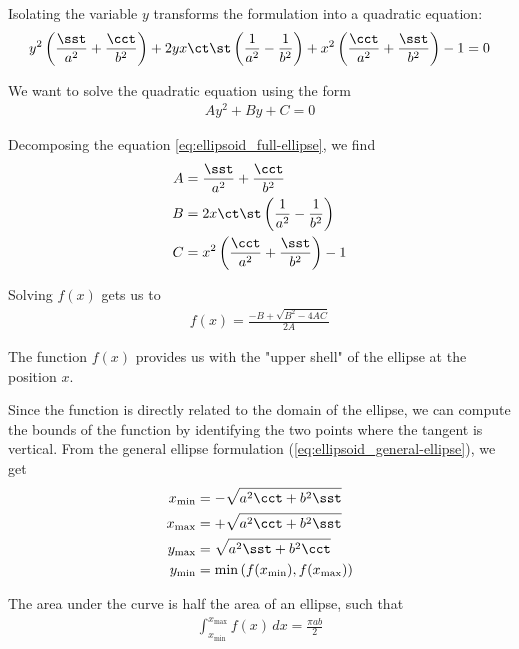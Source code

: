 Isolating the variable $y$ transforms the formulation into a quadratic equation:
\begin{align}
    \label{eq:ellipsoid_full-ellipse}
    y^2 \left( \frac{\sst}{a^2} + \frac{\cct}{b^2} \right) + 2yx \ct \st \left( \frac{1}{a^2} - \frac{1}{b^2} \right) + x^2 \left( \frac{\cct}{a^2} + \frac{\sst}{b^2} \right) - 1 = 0
\end{align}

We want to solve the quadratic equation using the form 
\begin{align}
    Ay^2 + By + C = 0
\end{align}

Decomposing the equation \eqref{eq:ellipsoid_full-ellipse}, we find
\begin{align}
    A &= \frac{\sst}{a^2} + \frac{\cct}{b^2} \\
    B &= 2x \ct \st \left( \frac{1}{a^2} - \frac{1}{b^2} \right) \\
    C &= x^2 \left( \frac{\cct}{a^2} + \frac{\sst}{b^2} \right) - 1
\end{align}


Solving $f(x)$ gets us to 
\begin{align}
    \label{eq:ellipsoid_final-ellipse}
    f(x) = \frac{-B + \sqrt{B^2 - 4 A C}}{2 A}
\end{align}

The function $f(x)$ provides us with the "upper shell" of the ellipse at the position $x$.

Since the function is directly related to the domain of the ellipse, we can compute the bounds of the function by identifying the two points where the tangent is vertical. From the general ellipse formulation (\eqref{eq:ellipsoid_general-ellipse}), we get 
\begin{align}
    \label{eq:ellipsoid_ellipse-bounds}
    x_{\text{min}} &= -\sqrt{a^2 \cct + b^2 \sst} \\
    x_{\text{max}} &= +\sqrt{a^2 \cct + b^2 \sst} \\
    y_{\text{max}} &= \sqrt{a^2 \sst + b^2 \cct} \\
    y_{\text{min}} &= \min\left( f(x_{\text{min}}), f(x_{\text{max}}) \right)
\end{align}

The area under the curve is half the area of an ellipse, such that 
\begin{align}
    \int_{x_{\text{min}}}^{x_{\text{max}}} f(x) \,dx = \frac{\pi a b}{2}
\end{align}

